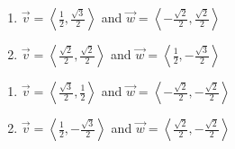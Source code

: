 \begin{multicols}{2} 

\begin{enumerate}

\setcounter{enumi}{\value{HW}}

\item $\vec{v} = \left\langle \frac{1}{2}, \frac{\sqrt{3}}{2} \right\rangle$ and $\vec{w} = \left\langle -\frac{\sqrt{2}}{2}, \frac{\sqrt{2}}{2} \right\rangle$
\item $\vec{v} = \left\langle \frac{\sqrt{2}}{2}, \frac{\sqrt{2}}{2} \right\rangle$ and $\vec{w} = \left\langle \frac{1}{2}, -\frac{\sqrt{3}}{2} \right\rangle$

\setcounter{HW}{\value{enumi}}

\end{enumerate}

\end{multicols}

\begin{multicols}{2} 

\begin{enumerate}

\setcounter{enumi}{\value{HW}}

\item $\vec{v} = \left\langle \frac{\sqrt{3}}{2}, \frac{1}{2} \right\rangle$ and $\vec{w} = \left\langle -\frac{\sqrt{2}}{2}, -\frac{\sqrt{2}}{2} \right\rangle$
\item $\vec{v} = \left\langle \frac{1}{2}, -\frac{\sqrt{3}}{2} \right\rangle$ and $\vec{w} = \left\langle \frac{\sqrt{2}}{2}, -\frac{\sqrt{2}}{2} \right\rangle$ \label{dotprodbasiclast}

\setcounter{HW}{\value{enumi}}

\end{enumerate}

\end{multicols}


